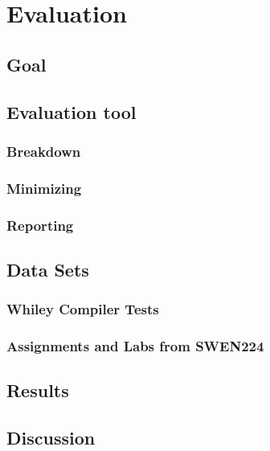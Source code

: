 \chapter{Evaluation}\label{C:eval}
%

\section{Goal}

\section{Evaluation tool}

\subsection{Breakdown}

\subsection{Minimizing}

\subsection{Reporting}

\section{Data Sets}

\subsection{Whiley Compiler Tests}

\subsection{Assignments and Labs from SWEN224}

\section{Results}

\section{Discussion}
